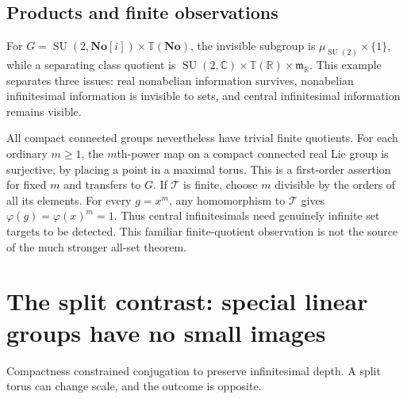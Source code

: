 \documentclass[11pt,letterpaper]{article}
\numberwithin{equation}{section}
\theoremstyle{definition}
\theoremstyle{remark}
\newcommand{\No}{\mathbf{No}}
\newcommand{\R}{\mathbb R}
\newcommand{\C}{\mathbb C}
\newcommand{\TT}{\mathbb T}
\newcommand{\mm}{\mathfrak m}
\newcommand{\SU}{\operatorname{SU}}
\begin{document}
\subsection{Products and finite observations}

For $G=\SU(2,\No[i])\times\TT(\No)$, the invisible subgroup is
$\mu_{\SU(2)}\times\{1\}$, while a separating class quotient is
$\SU(2,\C)\times\TT(\R)\times\mm_{\R}$. This example separates three issues:
real nonabelian information survives, nonabelian infinitesimal information is
invisible to sets, and central infinitesimal information remains visible.

All compact connected groups nevertheless have trivial finite quotients. For each
ordinary $m\ge1$, the $m$th-power map on a compact connected real Lie group is
surjective, by placing a point in a maximal torus. This is a first-order
assertion for fixed $m$ and transfers to $G$. If $\mathcal T$ is finite, choose
$m$ divisible by the orders of all its elements. For every $g=x^m$, any
homomorphism to $\mathcal T$ gives $\varphi(g)=\varphi(x)^m=1$. Thus central
infinitesimals need genuinely infinite set targets to be detected. This familiar
finite-quotient observation is not the source of the much stronger all-set
theorem.

\section{The split contrast: special linear groups have no small images}\label{e3:cpt:sec:split}

Compactness constrained conjugation to preserve infinitesimal depth. A split
torus can change scale, and the outcome is opposite.
\end{document}
